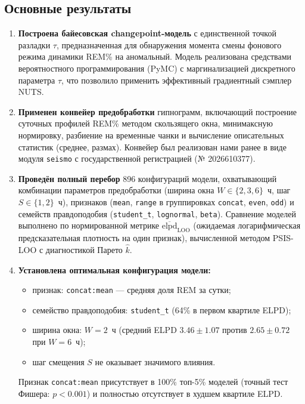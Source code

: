 \documentclass[14pt]{mmcs_article}
\begin{document}
	\subsection*{Основные результаты}
	
	\begin{enumerate}
		\item \textbf{Построена байесовская changepoint-модель}
		с единственной точкой разладки $\tau$,
		предназначенная для обнаружения момента смены
		фонового режима динамики REM\% на аномальный.
		Модель реализована средствами вероятностного
		программирования (PyMC) с маргинализацией
		дискретного параметра $\tau$, что позволило
		применить эффективный градиентный сэмплер NUTS.
		
		\item \textbf{Применен конвейер предобработки}
		гипнограмм, включающий построение суточных
		профилей REM\% методом скользящего окна,
		минимаксную нормировку, разбиение на временные
		чанки и вычисление описательных статистик
		(среднее, размах). Конвейер был реализован нами ранее в виде
		модуля \texttt{seismo} с государственной
		регистрацией (№ 2026610377).
		
		\item \textbf{Проведён полный перебор} 896
		конфигураций модели, охватывающий комбинации
		параметров предобработки (ширина окна $W \in
		\{2, 3, 6\}$~ч, шаг $S \in \{1, 2\}$~ч),
		признаков (\texttt{mean}, \texttt{range} в
		группировках \texttt{concat}, \texttt{even},
		\texttt{odd}) и семейств правдоподобия
		(\texttt{student\_t}, \texttt{lognormal},
		\texttt{beta}). Сравнение моделей выполнено по
		нормированной метрике
		$\overline{\mathrm{elpd}}_{\mathrm{LOO}}$
		(ожидаемая логарифмическая предсказательная
		плотность на один признак), вычисленной методом
		PSIS-LOO с диагностикой Парето $\hat{k}$.
		
		\item \textbf{Установлена оптимальная конфигурация
			модели:}
		\begin{itemize}
			\item признак: \texttt{concat:mean} — средняя
			доля REM за сутки;
			\item семейство правдоподобия:
			\texttt{student\_t} (64\% в первом
			квартиле ELPD);
			\item ширина окна: $W = 2$~ч (средний ELPD
			$3.46 \pm 1.07$ против $2.65 \pm 0.72$
			при $W = 6$~ч);
			\item шаг смещения $S$ не оказывает значимого
			влияния.
		\end{itemize}
		Признак \texttt{concat:mean} присутствует в 100\%
		топ-5\% моделей (точный тест Фишера: $p < 0.001$)
		и полностью отсутствует в худшем квартиле ELPD.
		

\end{enumerate}
\end{document}
